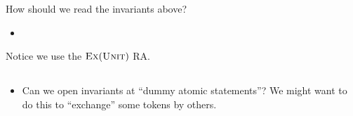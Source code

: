 How should we read the invariants above?
\begin{itemize}
\item 
\end{itemize}

Notice we use the $\textsc{Ex}(\textsc{Unit})$ RA.

\subsection{}
\begin{itemize}
\item Can we open invariants at ``dummy atomic statements''? We might want to do this to ``exchange'' some tokens by others.
\end{itemize}